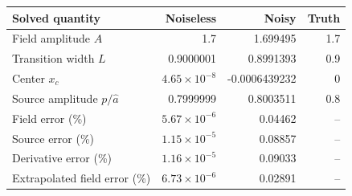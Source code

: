 \begin{tabular}{@{}lrrr@{}}
\toprule
Solved quantity & Noiseless & Noisy & Truth \\
\midrule
Field amplitude $A$ & 1.7 & 1.699495 & 1.7 \\
Transition width $L$ & 0.9000001 & 0.8991393 & 0.9 \\
Center $x_c$ & $4.65\times10^{-8}$ & -0.0006439232 & 0 \\
Source amplitude $p/\widehat a$ & 0.7999999 & 0.8003511 & 0.8 \\
Field error (\%) & $5.67\times10^{-6}$ & 0.04462 & -- \\
Source error (\%) & $1.15\times10^{-5}$ & 0.08857 & -- \\
Derivative error (\%) & $1.16\times10^{-5}$ & 0.09033 & -- \\
Extrapolated field error (\%) & $6.73\times10^{-6}$ & 0.02891 & -- \\
\bottomrule
\end{tabular}
